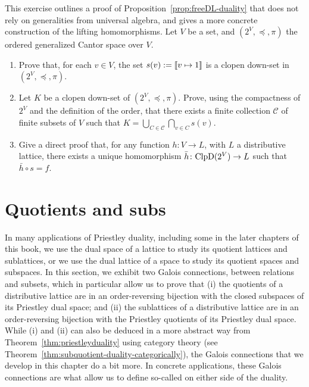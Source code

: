 \begin{exercise}\label{exe:freeDL-dual-altproof}
  This exercise outlines a proof of Proposition~\ref{prop:freeDL-duality} that does not rely on generalities from universal algebra, and gives a more concrete construction of the lifting homomorphisms. %
  Let $V$ be a set, and $(2^V, \preceq, \pi)$ the ordered generalized Cantor space over $V$. %

  \begin{enumerate}
    \item Prove that, for each $v \in V$, the set $s(v) := \llbracket {v \mapsto 1} \rrbracket$ is a clopen down-set in $(2^V, \preceq, \pi)$.
    \item Let $K$ be a clopen down-set of $(2^V, \preceq, \pi)$. Prove, using the compactness of $2^V$ and the definition of the order, that there exists a finite collection $\mathcal{C}$ of finite subsets of $V$ such that $K = \bigcup_{C \in \mathcal{C}} \bigcap_{v \in C} s(v)$.
    \item Give a direct proof that, for any function $h \colon V \to L$, with $L$ a distributive lattice, there exists a unique homomorphism $\bar{h} \colon \mathrm{ClpD}(2^V) \to L$ such that $\bar{h} \circ s = f$.
  \end{enumerate}
\end{exercise}

\section{Quotients and subs}\label{sec:quotients-and-subs}
In many applications of Priestley duality, including some in the later chapters of this book, we use the dual space of a lattice to study its quotient lattices and sublattices, or we use the dual lattice of a space to study its quotient spaces and subspaces. 
In this section, we exhibit two Galois connections, between relations and subsets, which in particular allow us to prove that (i) the quotients of a distributive lattice are in an order-reversing bijection with the closed subspaces of its Priestley dual space; and (ii) the sublattices of a distributive lattice are in an order-reversing bijection with the Priestley quotients of its Priestley dual space. While (i) and (ii) can also be deduced in a more abstract way from Theorem~\ref{thm:priestleyduality} using category theory (see Theorem~\ref{thm:subquotient-duality-categorically}), the Galois connections that we develop in this chapter do a bit more. In concrete applications, these Galois connections are what allow us to define so-called  on either side of the duality.

